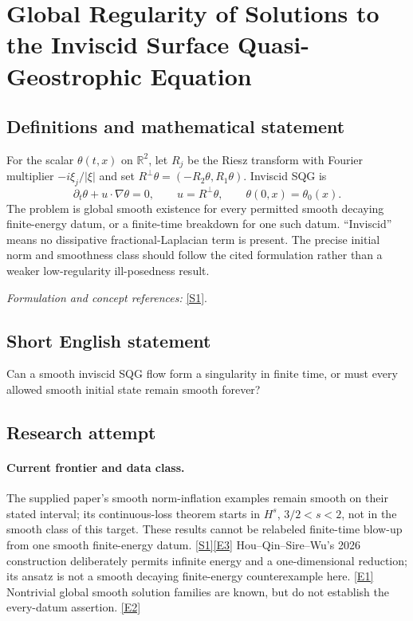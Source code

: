 \documentclass[11pt,a4paper]{article}
\newcommand{\R}{\mathbb{R}}
\newcommand{\sref}[2]{\hyperlink{source:#1:#2}{[S#2]}}
\newcommand{\eref}[2]{\hyperlink{extra:#1:#2}{[E#2]}}
\newif\ifshowcatalogue
\newcommand{\cataloguescope}[1]{\ifshowcatalogue
 \paragraph{Exact scope in the supplied catalogue.}
 \begin{quote}\small #1\end{quote}\fi}
\numberwithin{equation}{section}
\begin{document}
\setcounter{section}{0}
\clearpage
\section*{\texorpdfstring{Global Regularity of Solutions to the Inviscid Surface Quasi-Geostrophic Equation}{Global Regularity of Solutions to the Inviscid Surface Quasi-Geostrophic Equation}}\label{30006753}
\subsection{Definitions and mathematical statement}
For the scalar $\theta(t,x)$ on $\R^2$, let $R_j$ be the Riesz transform with Fourier multiplier $-i\xi_j/|\xi|$ and set $R^\perp\theta=(-R_2\theta,R_1\theta)$. Inviscid SQG is
\[
 \partial_t\theta+u\cdot\nabla\theta=0,\qquad u=R^\perp\theta,
 \qquad\theta(0,x)=\theta_0(x).
\]
The problem is global smooth existence for every permitted smooth decaying finite-energy datum, or a finite-time breakdown for one such datum. ``Inviscid'' means no dissipative fractional-Laplacian term is present. The precise initial norm and smoothness class should follow the cited formulation rather than a weaker low-regularity ill-posedness result.
\par\smallskip\textit{Formulation and concept references:} \sref{30006753}{1}.
\cataloguescope{For the inviscid SQG equation partial\_t theta + u dot grad theta = 0 on R\textasciicircum{}2, with u = R-perp theta, prove global smooth existence for every sufficiently smooth decaying finite-energy initial datum, or construct such a datum whose solution develops a finite-time singularity.}
\subsection{Short English statement}
Can a smooth inviscid SQG flow form a singularity in finite time, or must every allowed smooth initial state remain smooth forever?
\subsection{Research attempt}

\paragraph{Current frontier and data class.}
The supplied paper's smooth norm-inflation examples remain smooth on their
stated interval; its continuous-loss theorem starts in $H^s$, $3/2<s<2$,
not in the smooth class of this target. These results cannot be relabeled
finite-time blow-up from one smooth finite-energy datum.
\sref{30006753}{1}\eref{30006753}{3}
Hou--Qin--Sire--Wu's 2026 construction deliberately permits infinite energy
and a one-dimensional reduction; its ansatz is not a smooth decaying
finite-energy counterexample here. \eref{30006753}{1}
Nontrivial global smooth solution families are known, but do not establish
the every-datum assertion. \eref{30006753}{2}
\end{document}
